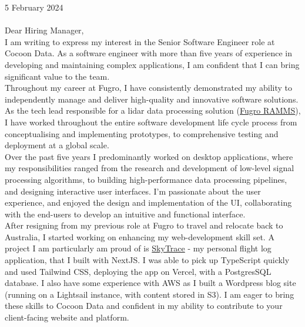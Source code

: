 \documentclass[10pt,letterpaper]{article}
\begin{document}


\vspace{30pt}

5 February 2024 \\ \\

Dear Hiring Manager, \\

I am writing to express my interest in the Senior Software Engineer role at Cocoon Data. As a software engineer with more than five years of experience in developing and maintaining complex applications, I am confident that I can bring significant value to the team. \\

Throughout my career at Fugro, I have consistently demonstrated my ability to independently manage and deliver high-quality and innovative software solutions. As the tech lead responsible for a lidar data processing solution (\href{https://www.youtube.com/watch?v=f65bdm4tous}{\underline{Fugro RAMMS}}), I have worked throughout the entire software development life cycle process from conceptualising and implementing prototypes, to comprehensive testing and deployment at a global scale. \\

Over the past five years I predominantly worked on desktop applications, where my responsibilities ranged from the research and development of low-level signal processing algorithms, to building high-performance data processing pipelines, and designing interactive user interfaces. I'm passionate about the user experience, and enjoyed the design and implementation of the UI, collaborating with the end-users to develop an intuitive and functional interface. \\

After resigning from my previous role at Fugro to travel and relocate back to Australia, I started working on enhancing my web-development skill set. A project I am particularly am proud of is {\underline{SkyTrace}} - my personal flight log application, that I built with NextJS. I was able to pick up TypeScript quickly and used Tailwind CSS, deploying the app on Vercel, with a PostgresSQL database. I also have some experience with AWS as I built a Wordpress blog site (running on a Lightsail instance, with content stored in S3). I am eager to bring these skills to Cocoon Data and confident in my ability to contribute to your client-facing website and platform. \\
\end{document}
